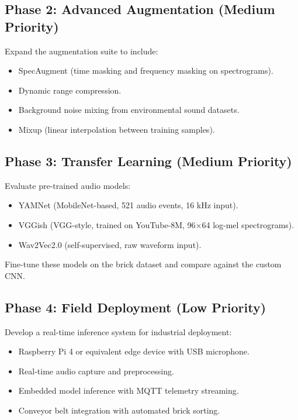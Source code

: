 \documentclass[12pt,a4paper,oneside]{report}
\begin{document}
\subsection{Phase 2: Advanced Augmentation (Medium Priority)}

Expand the augmentation suite to include:
\begin{itemize}
    \item SpecAugment (time masking and frequency masking on spectrograms).
    \item Dynamic range compression.
    \item Background noise mixing from environmental sound datasets.
    \item Mixup (linear interpolation between training samples).
\end{itemize}

\subsection{Phase 3: Transfer Learning (Medium Priority)}

Evaluate pre-trained audio models:
\begin{itemize}
    \item YAMNet (MobileNet-based, 521 audio events, 16 kHz input).
    \item VGGish (VGG-style, trained on YouTube-8M, 96×64 log-mel spectrograms).
    \item Wav2Vec2.0 (self-supervised, raw waveform input).
\end{itemize}

Fine-tune these models on the brick dataset and compare against the custom CNN.

\subsection{Phase 4: Field Deployment (Low Priority)}

Develop a real-time inference system for industrial deployment:
\begin{itemize}
    \item Raspberry Pi 4 or equivalent edge device with USB microphone.
    \item Real-time audio capture and preprocessing.
    \item Embedded model inference with MQTT telemetry streaming.
    \item Conveyor belt integration with automated brick sorting.
\end{itemize}
\end{document}
